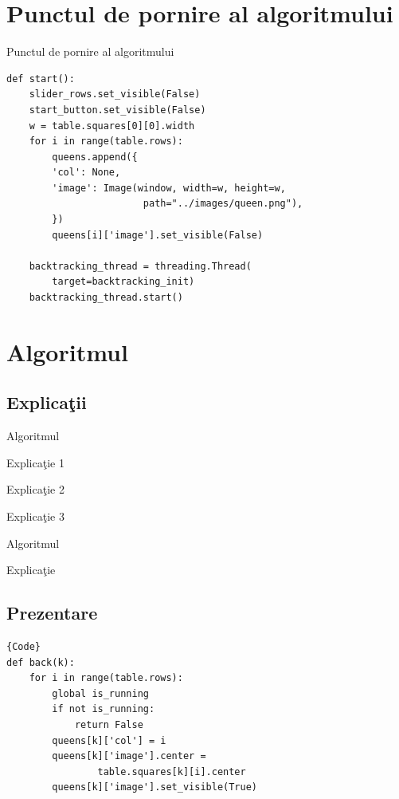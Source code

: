 \documentclass{beamer}
\begin{document}
\section{Punctul de pornire al algoritmului}

\begin{frame}[fragile]{Punctul de pornire al algoritmului}

\begin{lstlisting}[caption={Start Function}]
def start():
    slider_rows.set_visible(False)
    start_button.set_visible(False)
    w = table.squares[0][0].width
    for i in range(table.rows):
        queens.append({
        'col': None,
        'image': Image(window, width=w, height=w, 
                        path="../images/queen.png"),
        })
        queens[i]['image'].set_visible(False)

    backtracking_thread = threading.Thread(
        target=backtracking_init)
    backtracking_thread.start()
\end{lstlisting}
    
\end{frame}

\section{Algoritmul}
\subsection{Explica\c tii}

\begin{frame}{Algoritmul}
    \begin{block}{Explica\c tie 1}
        \lipsum[1][1]
    \end{block}

    \begin{block}{Explica\c tie 2}
        \lipsum[1][1-2]
    \end{block}

    \begin{block}{Explica\c tie 3}
        \lipsum[2][1-3]
    \end{block}
\end{frame}

\begin{frame}[fragile]{Algoritmul}
    \begin{block}{Explica\c tie}
        \lipsum[1][1-2]
    \end{block}

    \subsection{Prezentare}

    \begin{lstlisting}{Code}
def back(k):
    for i in range(table.rows):
        global is_running
        if not is_running:
            return False
        queens[k]['col'] = i
        queens[k]['image'].center = 
                table.squares[k][i].center
        queens[k]['image'].set_visible(True)

    \end{lstlisting}
\end{frame}
\end{document}
